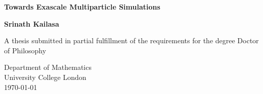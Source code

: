 \begin{titlepage}
    \begin{center}
        \vspace*{1cm}

        \Huge
        \textbf{Towards Exascale Multiparticle Simulations}

        \Large
        \vspace{0.5cm}

        \vfill

        \textbf{Srinath Kailasa}

        \vspace{5cm}

        A thesis submitted in partial fulfillment of the requirements for the
        degree Doctor of Philosophy 

        \vspace{0.8cm}


        \large
        Department of Mathematics\\
        University College London\\
        \monthyeardate\today

    \end{center}
 \end{titlepage}